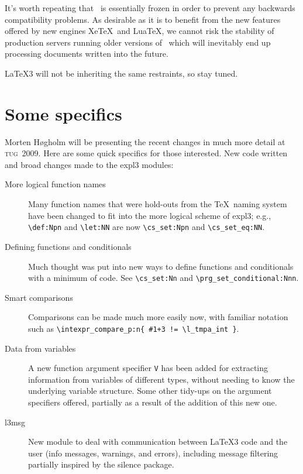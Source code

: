 \documentclass{ltnews}
\newcommand\TUG[1]{\textsc{tug}~#1}
\begin{document}
It's worth repeating that \LaTeXe\ is essentially frozen in order to
prevent any backwards compatibility problems. As desirable as it is
to benefit from the new features offered by new engines Xe\TeX\ and
Lua\TeX, we cannot risk the stability of production servers running
older versions of \LaTeXe\ which will inevitably end up processing
documents written into the future.

\LaTeX3 will not be inheriting the same restraints, so stay tuned.

\newpage

\section{Some specifics}

Morten H\o gholm will be presenting the recent changes in much more detail at
\TUG{2009}. Here are some quick specifics for those interested. New code written
and broad changes made to the \textsf{expl3} modules:
\begin{description}
\item [More logical function names]
  Many function names that were hold-outs from the \TeX\ naming system
  have been changed to fit into the more logical scheme of \textsf{expl3}; e.g.,
  \verb|\def:Npn| and \verb|\let:NN| are now \verb|\cs_set:Npn| and 
  \verb|\cs_set_eq:NN|.
  
\item [Defining functions and conditionals] 
  Much thought was put into new ways to define
  functions and conditionals with a minimum of code.
  See \verb|\cs_set:Nn| and \verb|\prg_set_conditional:Nnn|.
  
\item [Smart comparisons] 
  Comparisons can be made much more easily now, with familiar notation such as
  \verb|\intexpr_compare_p:n{ #1+3 != \l_tmpa_int }|.
  
\item [Data from variables] A new function argument specifier \texttt{V} has
  been added for extracting information from variables of different types,
  without needing to know the underlying variable structure. Some other
  tidy-ups on the argument specifiers offered, partially as a result of the
  addition of this new one.
  
\item [l3msg] New module to deal with communication between \LaTeX3 code
  and the user (info messages, warnings, and errors), including message
  filtering partially inspired by the \textsf{silence} package.
  \end{description}
\end{document}
